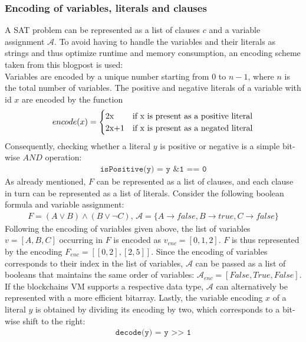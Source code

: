 \subsubsection{Encoding of variables, literals and clauses}
A SAT problem can be represented as a list of clauses $c$ and a variable assignment $\mathcal{A}$. To avoid having to handle the variables and their literals as strings and thus optimize runtime and memory consumption, an encoding scheme taken from this blogpost\cite{sabablog} is used: \\
Variables are encoded by a unique number starting from $0$ to $n-1$, where $n$ is the total number of variables. The positive and negative literals of a variable with id $x$ are encoded by the function
\begin{align*}
encode(x) =
\begin{cases}
  $2x$  & \text{if x is present as a positive literal}\\
  $2x+1$ & \text{if x is present as a negated literal}\\
\end{cases}   
\end{align*}
Consequently, checking whether a literal $y$ is positive or negative is a simple bit-wise $AND$ operation:
\begin{align*}
\texttt{isPositive(y) = y \& 1 == 0}
\end{align*}
As already mentioned, $F$ can be represented as a list of clauses, and each clause in turn can be represented as a list of literals. Consider the following boolean formula and variable assignment:
\begin{align*}
F = (A \vee B) \wedge (B \vee \neg C) \text{, } \mathcal{A} = \{A \rightarrow false, B \rightarrow true, C \rightarrow false\}
\end{align*}
Following the encoding of variables given above, the list of variables $v=[A,B,C]$ occurring in $F$ is encoded as $v_{enc} = [0,1,2]$. $F$ is thus represented by the encoding $F_{enc} = [[0,2],[2,5]]$. Since the encoding of variables corresponds to their index in the list of variables, $\mathcal{A}$ can be passed as a list of booleans that maintains the same order of variables: $\mathcal{A}_{enc} = [False, True, False]$. If the blockchains VM supports a respective data type, $\mathcal{A}$ can alternatively be represented with a more efficient bitarray. Lastly, the variable encoding $x$ of a literal $y$ is obtained by dividing its encoding by two, which corresponds to a bit-wise shift to the right:
\begin{align*}
\texttt{decode(y) = y >> 1}
\end{align*}

